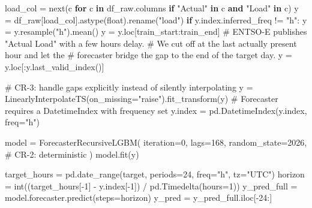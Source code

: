 \documentclass[
  english,
  letterpaper,
]{scrbook}
\newenvironment{Shaded}{\begin{snugshade}}{\end{snugshade}}
\newcommand{\BuiltInTok}[1]{\textcolor[rgb]{0.00,0.23,0.31}{#1}}
\newcommand{\CommentTok}[1]{\textcolor[rgb]{0.37,0.37,0.37}{#1}}
\newcommand{\ControlFlowTok}[1]{\textcolor[rgb]{0.00,0.23,0.31}{\textbf{#1}}}
\newcommand{\DecValTok}[1]{\textcolor[rgb]{0.68,0.00,0.00}{#1}}
\newcommand{\KeywordTok}[1]{\textcolor[rgb]{0.00,0.23,0.31}{\textbf{#1}}}
\newcommand{\NormalTok}[1]{\textcolor[rgb]{0.00,0.23,0.31}{#1}}
\newcommand{\OperatorTok}[1]{\textcolor[rgb]{0.37,0.37,0.37}{#1}}
\newcommand{\StringTok}[1]{\textcolor[rgb]{0.13,0.47,0.30}{#1}}
\begin{document}
\begin{Shaded}
\begin{Highlighting}[]
\NormalTok{    load\_col }\OperatorTok{=} \BuiltInTok{next}\NormalTok{(c }\ControlFlowTok{for}\NormalTok{ c }\KeywordTok{in}\NormalTok{ df\_raw.columns }\ControlFlowTok{if} \StringTok{"Actual"} \KeywordTok{in}\NormalTok{ c }\KeywordTok{and} \StringTok{"Load"} \KeywordTok{in}\NormalTok{ c)}
\NormalTok{    y }\OperatorTok{=}\NormalTok{ df\_raw[load\_col].astype(}\BuiltInTok{float}\NormalTok{).rename(}\StringTok{"load"}\NormalTok{)}
    \ControlFlowTok{if}\NormalTok{ y.index.inferred\_freq }\OperatorTok{!=} \StringTok{"h"}\NormalTok{:}
\NormalTok{        y }\OperatorTok{=}\NormalTok{ y.resample(}\StringTok{"h"}\NormalTok{).mean()}
\NormalTok{    y }\OperatorTok{=}\NormalTok{ y.loc[train\_start:train\_end]}
    \CommentTok{\# ENTSO{-}E publishes "Actual Load" with a few hours\textquotesingle{} delay.}
    \CommentTok{\# We cut off at the last actually present hour and let the}
    \CommentTok{\# forecaster bridge the gap to the end of the target day.}
\NormalTok{    y }\OperatorTok{=}\NormalTok{ y.loc[:y.last\_valid\_index()]}

    \CommentTok{\# CR{-}3: handle gaps explicitly instead of silently interpolating}
\NormalTok{    y }\OperatorTok{=}\NormalTok{ LinearlyInterpolateTS(on\_missing}\OperatorTok{=}\StringTok{"raise"}\NormalTok{).fit\_transform(y)}
    \CommentTok{\# Forecaster requires a DatetimeIndex with frequency set}
\NormalTok{    y.index }\OperatorTok{=}\NormalTok{ pd.DatetimeIndex(y.index, freq}\OperatorTok{=}\StringTok{"h"}\NormalTok{)}

\NormalTok{    model }\OperatorTok{=}\NormalTok{ ForecasterRecursiveLGBM(}
\NormalTok{        iteration}\OperatorTok{=}\DecValTok{0}\NormalTok{,}
\NormalTok{        lags}\OperatorTok{=}\DecValTok{168}\NormalTok{,}
\NormalTok{        random\_state}\OperatorTok{=}\DecValTok{2026}\NormalTok{,  }\CommentTok{\# CR{-}2: deterministic}
\NormalTok{    )}
\NormalTok{    model.fit(y)}

\NormalTok{    target\_hours }\OperatorTok{=}\NormalTok{ pd.date\_range(target, periods}\OperatorTok{=}\DecValTok{24}\NormalTok{, freq}\OperatorTok{=}\StringTok{"h"}\NormalTok{, tz}\OperatorTok{=}\StringTok{"UTC"}\NormalTok{)}
\NormalTok{    horizon }\OperatorTok{=} \BuiltInTok{int}\NormalTok{((target\_hours[}\OperatorTok{{-}}\DecValTok{1}\NormalTok{] }\OperatorTok{{-}}\NormalTok{ y.index[}\OperatorTok{{-}}\DecValTok{1}\NormalTok{]) }\OperatorTok{/}\NormalTok{ pd.Timedelta(hours}\OperatorTok{=}\DecValTok{1}\NormalTok{))}
\NormalTok{    y\_pred\_full }\OperatorTok{=}\NormalTok{ model.forecaster.predict(steps}\OperatorTok{=}\NormalTok{horizon)}
\NormalTok{    y\_pred }\OperatorTok{=}\NormalTok{ y\_pred\_full.iloc[}\OperatorTok{{-}}\DecValTok{24}\NormalTok{:]}


\end{Highlighting}
\end{Shaded}
\end{document}
